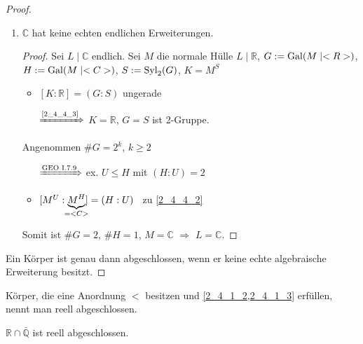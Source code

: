 \begin{proof}
\begin{enumerate}[label={Beh. \arabic*:},left=0pt,labelwidth=7em,topsep=-6pt,align=left,ref={Beh.~\arabic*}]
		\begin{proof}
			$[L\mid\mathbb R] = n$ ungerade \begin{itemize}[topsep=-6pt,label={$\Rightarrow$},widest={$\xRightarrow{\propref{1_9_5}}$},leftmargin=*]
				\item[$\xRightarrow{\propref{1_9_5}}$] $L=\mathbb R(\alpha)$ für ein $\alpha$
				\item $f:=\MinPol(\alpha\mid\mathbb R)$ hat Grad $\deg(f) = \deg(\alpha\mid \mathbb R) = [\mathbb R(\alpha):\mathbb R] = n$ ungerade
			\end{itemize}
			\begin{align*}
				\hspace*{-3em}\left.\begin{array}{@{}l}
					f\;\text{ist irreduzibel} \\
					f\;\text{hat Nullstelle in $\mathbb R$ nach \propref{2_4_1_3}}
				\end{array}\right\rbrace \quad\Rightarrow\quad \deg(f) = 1\quad\Rightarrow\quad L =\mathbb R
			\end{align*}
		\end{proof}
	
		\item $\mathbb C$ hat keine echten endlichen Erweiterungen.
		
		\begin{proof}
			Sei $L\mid\mathbb C$ endlich. Sei $M$ die normale Hülle $L\mid\mathbb R$, $G:=\operatorname{Gal}(M\mid <R>)$, $H:= \operatorname{Gal}(M\mid <C>)$, $S := \operatorname{Syl}_2(G)$, $K=M^S$
			\begin{itemize}[topsep=-6pt,label={$\Rightarrow$},widest={$\xRightarrow{\text{GEO~I.7.9}}$},leftmargin=*]
				\item $[K:\mathbb R] = (G:S)$ ungerade
				\item[$\xRightarrow{\text{\ref{2_4_4_3}}}$] $K=\mathbb R$, $G=S$ ist 2-Gruppe.
			\end{itemize}
			\medskip
			Angenommen $\# G = 2^k$, $k\ge 2$\begin{itemize}[topsep=-6pt,label={$\Rightarrow$},widest={$\xRightarrow{\text{GEO~I.7.9}}$},leftmargin=*]
				\item[$\xRightarrow{\text{GEO~I.7.9}}$] ex. $U\le H$ mit $(H:U) = 2$
				\item $[M^U:\underbrace{M^H}_{\mathclap{=\mathbb C}}] = (H:U)$ \Lightning\ zu \ref{2_4_4_2}
			\end{itemize}
			\medskip
			Somit ist $\# G = 2$, $\# H=1$, $M=\mathbb C$ $\Rightarrow$ $L=\mathbb C$.
		\end{proof}
	\end{enumerate}
	Ein Körper ist genau dann abgeschlossen, wenn er keine echte algebraische Erweiterung besitzt.
\end{proof}

\begin{remark}
	Körper, die eine Anordnung $<$ besitzen und \cref{2_4_1_2,2_4_1_3} erfüllen, nennt man reell abgeschlossen.
\end{remark}

\begin{example}
	$\mathbb R\cap \bar{\mathbb Q}$ ist reell abgeschlossen.
\end{example}